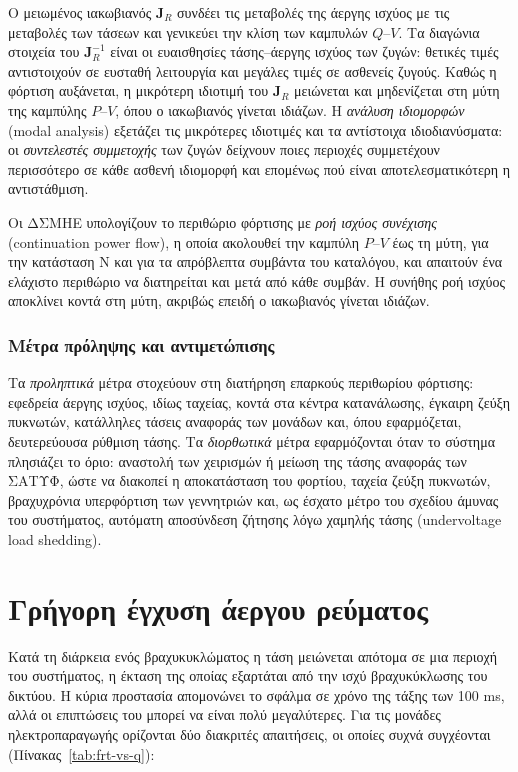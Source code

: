 Ο μειωμένος ιακωβιανός $\mathbf{J}_R$ συνδέει τις μεταβολές της άεργης ισχύος με τις
μεταβολές των τάσεων και γενικεύει την κλίση των καμπυλών $Q$--$V$. Τα διαγώνια στοιχεία του
$\mathbf{J}_R^{-1}$ είναι οι ευαισθησίες τάσης--άεργης ισχύος των ζυγών: θετικές τιμές
αντιστοιχούν σε ευσταθή λειτουργία και μεγάλες τιμές σε ασθενείς ζυγούς. Καθώς η φόρτιση
αυξάνεται, η μικρότερη ιδιοτιμή του $\mathbf{J}_R$ μειώνεται και μηδενίζεται στη μύτη της
καμπύλης $P$--$V$, όπου ο ιακωβιανός γίνεται ιδιάζων. Η \emph{ανάλυση ιδιομορφών} (modal
analysis) εξετάζει τις μικρότερες ιδιοτιμές και τα αντίστοιχα ιδιοδιανύσματα: οι
\emph{συντελεστές συμμετοχής} των ζυγών δείχνουν ποιες περιοχές συμμετέχουν περισσότερο σε
κάθε ασθενή ιδιομορφή και επομένως πού είναι αποτελεσματικότερη η αντιστάθμιση.

Οι ΔΣΜΗΕ υπολογίζουν το περιθώριο φόρτισης με \emph{ροή ισχύος συνέχισης} (continuation
power flow), η οποία ακολουθεί την καμπύλη $P$--$V$ έως τη μύτη, για την κατάσταση N και για τα
απρόβλεπτα συμβάντα του καταλόγου, και απαιτούν ένα ελάχιστο περιθώριο να διατηρείται και μετά
από κάθε συμβάν. Η συνήθης ροή ισχύος αποκλίνει κοντά στη μύτη, ακριβώς επειδή ο ιακωβιανός
γίνεται ιδιάζων.

\subsubsection{Μέτρα πρόληψης και αντιμετώπισης}

Τα \emph{προληπτικά} μέτρα στοχεύουν στη διατήρηση επαρκούς περιθωρίου φόρτισης: εφεδρεία
άεργης ισχύος, ιδίως ταχείας, κοντά στα κέντρα κατανάλωσης, έγκαιρη ζεύξη πυκνωτών, κατάλληλες
τάσεις αναφοράς των μονάδων και, όπου εφαρμόζεται, δευτερεύουσα ρύθμιση τάσης. Τα
\emph{διορθωτικά} μέτρα εφαρμόζονται όταν το σύστημα πλησιάζει το όριο: αναστολή των χειρισμών
ή μείωση της τάσης αναφοράς των ΣΑΤΥΦ, ώστε να διακοπεί η αποκατάσταση του
φορτίου, ταχεία ζεύξη πυκνωτών, βραχυχρόνια υπερφόρτιση των γεννητριών και, ως έσχατο μέτρο του
σχεδίου άμυνας του συστήματος, αυτόματη αποσύνδεση ζήτησης λόγω χαμηλής τάσης (undervoltage
load shedding).

\section{Γρήγορη έγχυση άεργου ρεύματος}
\label{sec:frt}

Κατά τη διάρκεια ενός βραχυκυκλώματος η τάση μειώνεται απότομα σε μια περιοχή του συστήματος,
η έκταση της οποίας εξαρτάται από την ισχύ βραχυκύκλωσης του δικτύου. Η κύρια προστασία
απομονώνει το σφάλμα σε χρόνο της τάξης των 100 ms, αλλά οι επιπτώσεις του μπορεί να είναι
πολύ μεγαλύτερες. Για τις μονάδες ηλεκτροπαραγωγής ορίζονται δύο διακριτές απαιτήσεις, οι
οποίες συχνά συγχέονται (Πίνακας~\ref{tab:frt-vs-q}):

